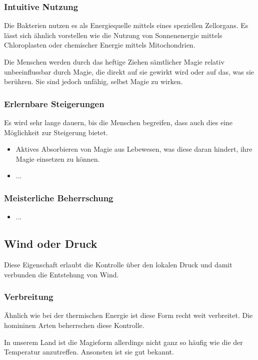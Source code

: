\subsubsection{Intuitive Nutzung}
Die Bakterien nutzen es als Energiequelle mittels eines speziellen Zellorgans. Es lässt sich ähnlich vorstellen wie die Nutzung von Sonnenenergie mittels Chloroplasten oder chemischer Energie mittels Mitochondrien. 

Die Menschen werden durch das heftige Ziehen sämtlicher Magie relativ unbeeinflussbar durch Magie, die direkt auf sie gewirkt wird oder auf das, was sie berühren. Sie sind jedoch unfähig, selbst Magie zu wirken.

\subsubsection{Erlernbare Steigerungen}
Es wird sehr lange dauern, bis die Menschen begreifen, dass auch dies eine Möglichkeit zur Steigerung bietet.
\begin{itemize}
	\item Aktives Absorbieren von Magie aus Lebewesen, was diese daran hindert, ihre Magie einsetzen zu können.
	\item ...
\end{itemize}

\subsubsection{Meisterliche Beherrschung} 
\begin{itemize}
	\item ...
\end{itemize}




\subsection{Wind oder Druck}\label{sec:druckmagie}
Diese Eigenschaft erlaubt die Kontrolle über den lokalen Druck und damit verbunden die Entstehung von Wind.

\subsubsection{Verbreitung}
Ähnlich wie bei der thermischen Energie ist diese Form recht weit verbreitet. Die homininen Arten beherrschen diese Kontrolle. 

In unserem Land ist die Magieform allerdings nicht ganz so häufig wie die der Temperatur anzutreffen. Ansonsten ist sie gut bekannt.

